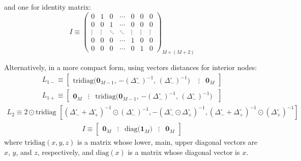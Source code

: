 \documentclass[11pt]{article}
\theoremstyle{definition}
\begin{document}
and one for identity matrix:
\begin{equation}\label{eq:I-extended}
{I} \equiv \begin{pmatrix}
0 & 1 & 0 & \cdots & 0 & 0 & 0\\
0 & 0 & 1 & \cdots & 0 & 0 & 0\\
\vdots & \vdots  & \ddots & \ddots &  \vdots  & \vdots  & \vdots  \\
0 & 0 & 0 & \cdots & 1 & 0 & 0 \\
0 & 0 & 0 & \cdots & 0 & 1 & 0
\end{pmatrix}_{M\times (M+2)}
\end{equation}

Alternatively, in a more compact form, using vectors distances for interior nodes:
\begin{align}
{L}_{1-} \equiv
\begin{bmatrix}
\text{tridiag($\mathbf{0}_{M-1}$, $-(\Delta_-^\circ)^{-1}$, $(\Delta_-^\circ)^{-1}$) } & \vdots & \mathbf{0}_M
\end{bmatrix}
\end{align}
\begin{align}
{L}_{1+} \equiv
\begin{bmatrix}
\mathbf{0}_M & \vdots &
\text{tridiag($\mathbf{0}_{M-1}$, $-(\Delta_-^\circ)^{-1}$, $(\Delta_-^\circ)^{-1}$) }
\end{bmatrix}
\end{align}
\begin{align}
{L}_{2} \equiv
2 \odot \text{tridiag $\left[(\Delta_-^\circ + \Delta_+^\circ)^{-1} \odot (\Delta_{-}^\circ)^{-1}, -(\Delta_-^\circ \odot \Delta_+^\circ)^{-1} , (\Delta_-^\circ + \Delta_+^\circ)^{-1} \odot (\Delta_{+}^\circ)^{-1} \right]$  }
\end{align}
\begin{align}
{I} \equiv
\begin{bmatrix}
\mathbf{0}_M & \vdots & \text{diag($\mathbf{1}_M$)} & \vdots & \mathbf{0}_M
\end{bmatrix}
\end{align}
where $\text{tridiag}(x,y,z)$ is a matrix whose lower, main, upper diagonal vectors are $x$, $y$, and $z$, respectively, and $\text{diag}(x)$ is a matrix whose diagonal vector is $x$.
\end{document}
